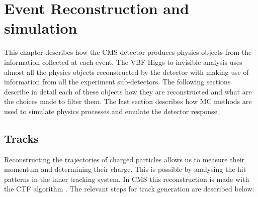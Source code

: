 \chapter{Event Reconstruction and simulation}
\label{CHAPTER:EventReconstructionAndSimulation}

\glsresetall %


This chapter describes how the \gls{CMS} detector produces physics objects from the information collected at each event. The \gls{VBF} Higgs to invisible analysis uses almost all the physics objects reconstructed by the detector with making use of information from all the experiment sub-detectors. The following sections describe in detail each of these objects how they are reconstructed and what are the choices made to filter them. The last section describes how \gls{MC} methods are used to simulate physics processes and emulate the detector response.

\section{Tracks}
\label{SECTION:EventReconstructionAndSimulation_Tracks}


Reconstructing the trajectories of charged particles allows us to measure their momentum and determining their charge. This is possible by analysing the hit patterns in the inner tracking system. In \gls{CMS} this reconstruction is made with the \gls{CTF} algorithm \cite{ARTICLE:CMSTrackReconstruction}. The relevant steps for track generation are described below:

